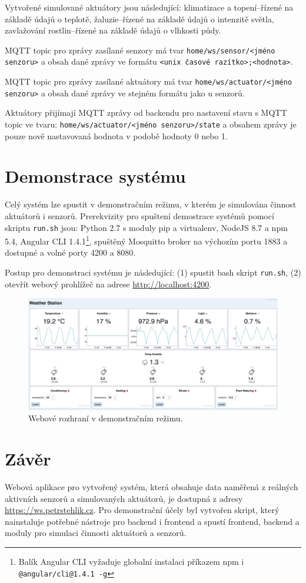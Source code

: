 \documentclass[11pt,a4paper]{article}
\begin{document}
Vytvořené simulované aktuátory jsou následující: klimatizace a topení--řízené na základě údajů o teplotě, žaluzie--řízené na základě údajů o intenzitě světla, zavlažování rostlin--řízené na základě údajů o vlhkosti půdy.

MQTT topic pro zprávy zasílané senzory má tvar \texttt{home/ws/sensor/<jméno senzoru>} a obsah dané zprávy ve formátu \texttt{<unix časové razítko>;<hodnota>}.

MQTT topic pro zprávy zasílané aktuátory má tvar \texttt{home/ws/actuator/<jméno senzoru>} a obsah dané zprávy ve stejném formátu jako u senzorů.

Aktuátory přijímají MQTT zprávy od backendu pro nastavení stavu s MQTT topic ve tvaru: \texttt{home/ws/actuator/<jméno senzoru>/state} a obsahem zprávy je pouze nově nastavovaná hodnota v podobě hodnoty 0 nebo 1.

\section{Demonstrace systému}\label{sec:res}
Celý systém lze spustit v demonstračním režimu, v kterém je simulována činnost aktuátorů i senzorů. Prerekvizity pro spuštení demostrace systémů pomocí skriptu \texttt{run.sh} jsou: Python 2.7 s moduly pip a virtualenv, NodeJS 8.7 a npm 5.4, Angular CLI 1.4.1\footnote{Balík Angular CLI vyžaduje globalní instalaci příkazem npm i \texttt{@angular/cli@1.4.1 -g}}, spuštěný Mosquitto broker na výchozím portu 1883 a dostupné a volné porty 4200 a 8080.

Postup pro demonstraci systému je následující: (1) spustit bash skript \texttt{run.sh}, (2) otevřít webový prohlížeč na adrese \url{http://localhost:4200}.

\begin{figure}[htb]
    \centering
    \includegraphics[width=0.75\linewidth]{web-2}
    \caption{Webové rozhraní v demonstračním režimu.}
    \label{fig:sw-scheme}
\end{figure}

\section{Závěr}\label{sec:sum}
Webová aplikace pro vytvořený systém, která obsahuje data naměřená z reálných aktivních senzorů a simulovaných aktuátorů, je dostupná z adresy \url{https://ws.petrstehlik.cz}. Pro demonstrační účely byl vytvořen skript, který nainstaluje potřebné nástroje pro backend i frontend a spustí frontend, backend a moduly pro simulaci činnosti aktuátorů a senzorů.
\end{document}
